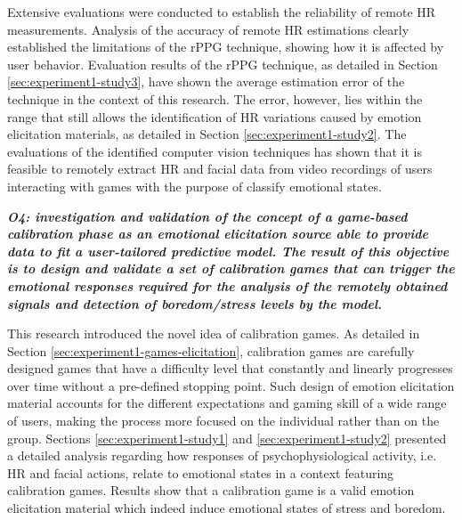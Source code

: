 Extensive evaluations were conducted to establish the reliability of remote HR measurements. Analysis of the accuracy of remote HR estimations clearly established the limitations of the rPPG technique, showing how it is affected by user behavior. Evaluation results of the rPPG technique, as detailed in Section \ref{sec:experiment1-study3}, have shown the average estimation error of the technique in the context of this research. The error, however, lies within the range that still allows the identification of HR variations caused by emotion elicitation materials, as detailed in Section \ref{sec:experiment1-study2}. The evaluations of the identified computer vision techniques has shown that it is feasible to remotely extract HR and facial data from video recordings of users interacting with games with the purpose of classify emotional states.


\textit{\textbf{O4: investigation and validation of the concept of a game-based calibration phase as an emotional elicitation source able to provide data to fit a user-tailored predictive model. The result of this objective is to design and validate a set of calibration games that can trigger the emotional responses required for the analysis of the remotely obtained signals and detection of boredom/stress levels by the model.}}

This research introduced the novel idea of calibration games. As detailed in Section \ref{sec:experiment1-games-elicitation}, calibration games are carefully designed games that have a difficulty level that constantly and linearly progresses over time without a pre-defined stopping point. Such design of emotion elicitation material accounts for the different expectations and gaming skill of a wide range of users, making the process more focused on the individual rather than on the group. Sections \ref{sec:experiment1-study1} and \ref{sec:experiment1-study2} presented a detailed analysis regarding how responses of psychophysiological activity, i.e. HR and facial actions, relate to emotional states in a context featuring calibration games. Results show that a calibration game is a valid emotion elicitation material which indeed induce emotional states of stress and boredom.

